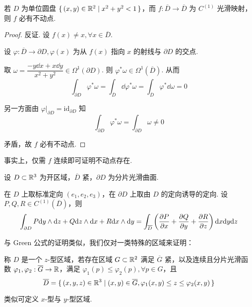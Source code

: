 \begin{example}
    若 $D$ 为单位圆盘 $\set{(x,y)\in\mathbb{R}^2|x^2+y^2<1}$，而 $f:\overline{D}\to\overline{D}$ 为 $C^{(1)}$ 光滑映射，则 $f$ 必有不动点.
\end{example}
\begin{proof}
    反证. 设 $f(x)\ne x,\forall x\in\overline{D}$.

    设 $\varphi:\overline{D}\to\partial{D},\varphi(x)$ 为从 $f(x)$ 指向 $x$ 的射线与 $\partial D$ 的交点.
    
    取 $\omega = \dfrac{-y\dd x+x\dd y}{x^2+y^2} \in\Omega^1(\partial D)$. 则 $\varphi^*\omega\in\Omega^1(\overline{D})$. 从而
$$
\int_{\partial D}\varphi^*\omega=\int_{\overline{D}}\dd\varphi^*\omega=\int_{\overline{D}}\varphi^*\dd\omega=0
$$

    另一方面由 $\varphi|_{\partial D}=\mathrm{id}_{\partial D}$ 知
$$
\int_{\partial D}\varphi^*\omega=\int_{\partial D}\omega\ne 0
$$

    矛盾，故 $f$ 必有不动点.
\end{proof}

\begin{hint}
    事实上，仅需 $f$ 连续即可证明不动点存在.
\end{hint}


\begin{theorem}
    设 $D\subset\mathbb{R}^3$ 为开区域，$\overline{D}$ 紧，$\partial D$ 为分片光滑曲面.

    在 $D$ 上取标准定向 $(e_1,e_2,e_3)$，在 $\partial D$ 上取由 $D$ 的定向诱导的定向. 设 $P,Q,R\in C^{(1)}(\overline{D})$，则
$$
\int_{\partial D}P\mathrm{d} y\wedge\mathrm{d} z+Q\mathrm{d} z\wedge\mathrm{d} x+R\mathrm{d} x\wedge\mathrm{d} y=\int_{\overline{D}}\left(\frac{\partial{P}}{\partial{x}}+\frac{\partial{Q}}{\partial{y}}+\frac{\partial{R}}{\partial{z}}\right)\mathrm{d} x\mathrm{d} y\mathrm{d} z
$$
\end{theorem}

与 Green 公式的证明类似，我们仅对一类特殊的区域来证明：

\begin{definition}
    称 $D$ 是一个 $z$-型区域，若存在区域 $G\subset\mathbb{R}^2$ 满足 $\overline{G}$ 紧，以及连续且分片光滑函数 $\varphi_1,\varphi_2:\overline{G}\to\mathbb{R}$，满足 $\varphi_1(p)\le\varphi_2(p),\forall p\in G$，且
$$
\overline{D}=\set{(x,y,z)\in\mathbb{R}^3|(x,y)\in\overline{G},\varphi_1(x,y)\le z\le\varphi_2(x,y)}
$$
\end{definition}

类似可定义 $x$-型与 $y$-型区域.

